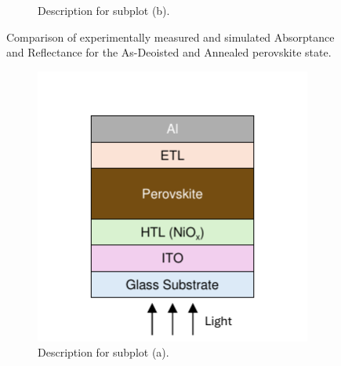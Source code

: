 \begin{figure}[htbp]
\begin{subfigure}[t]{0.49\textwidth}
        \caption{Description for subplot (b).}
        \label{fig:sub-b}
    \end{subfigure}

    \caption{Comparison of experimentally measured and simulated Absorptance and Reflectance for the As-Deoisted and Annealed perovskite state.}
    \label{fig:1x2plot}
\end{figure}

\begin{figure}[htbp]
    \centering
    \begin{subfigure}[t]{0.49\textwidth} %
        \centering
        \includegraphics[width=\textwidth]{chapters/material_properties/images/Glass_Stack.pdf} %
        \caption{Description for subplot (a).}
        \label{fig:sub-a}
    \end{subfigure}
    \hfill %
    \begin{subfigure}[t]{0.49\textwidth} %
        \centering

\end{subfigure}
\end{figure}
